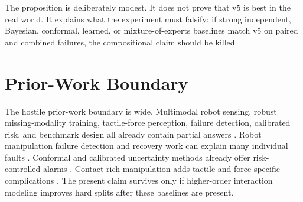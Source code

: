 \documentclass{article}
\begin{document}
The proposition is deliberately modest. It does not prove that v5 is best in the real world. It explains what the experiment must falsify: if strong independent, Bayesian, conformal, learned, or mixture-of-experts baselines match v5 on paired and combined failures, the compositional claim should be killed.

\section{Prior-Work Boundary}
The hostile prior-work boundary is wide. Multimodal robot sensing, robust missing-modality training, tactile-force perception, failure detection, calibrated risk, and benchmark design all already contain partial answers \citep{neves2023endtoend9,zhang2026fewshot10,lee2023abaxial11,wang2024multimodal12,yang2024computational13,liu2022learning14,kim2024mechanically15,zhao2024augmented16,dai2023soft17,liemhetcharat2013forming18,hashimoto2002sensor19,zheng2023autofed20,kubelka2015robust21,mulubika2025an22}. Robot manipulation failure detection and recovery work can explain many individual faults \citep{vijayaraghavan2025development23,ciuffreda2023a24,fard2025bayesian25,kalenberg2024stargate26,pruski2000sensor27,haider2022robust28,li2025focers29,majumdar2017funnel30,pu2025an31,thuruthel2019soft32,ehatishamulhaq2019robust33,kaymak2023development34,huang2025how35,wang2025mobile36,zou2022eventhd37,uhm2022design38,lee2025mins39,wang2021when40,din2017a41,thakur2025multimodal42}. Conformal and calibrated uncertainty methods already offer risk-controlled alarms \citep{fang2026when43,song2021multimodal44,arkin2020multimodal45,velasquez2022multisensor46,thiyagarajan2017predictive47,kim2022parasitic48,kim2020boron49,ali2025timetofault50,feliutalegon2021control51,yang2026edgebased52,dallalibera2011biologically53,kim2012robust54,fabien2026comparative55,xu2021a56,yamaguchi2019tactile57,nam2020robust58}. Contact-rich manipulation adds tactile and force-specific complications \citep{shin2003fault59,silva2018robust60,mahoney2016on61,gardner2020a62,chennddynamic63,ge2025vlamp64,angeletti2022a65,huang2026mcotvla66,mohammad2024a67,suk2025uncertaintyaware68,kluber2022when69,fletcher2010randomized70,jamone2015highly71,rollinson2013robust72,srikanth2026redteaming73,rosa2025smart74,soika2002a75,shaheryar2016a76}. The present claim survives only if higher-order interaction modeling improves hard splits after these baselines are present.
\end{document}
